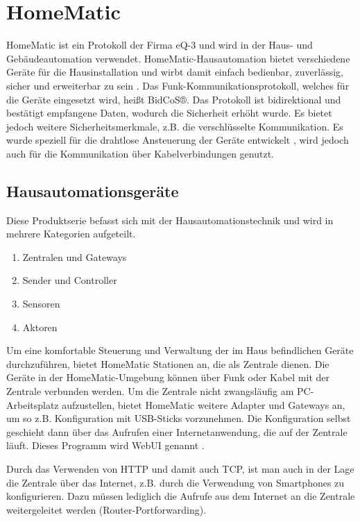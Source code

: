 \section{HomeMatic}

HomeMatic ist ein Protokoll der Firma eQ-3 und wird in der Haus- und Gebäudeautomation
verwendet.
HomeMatic-Hausautomation bietet verschiedene Geräte für die Hausinstallation und wirbt damit einfach bedienbar,
zuverlässig, sicher und erweiterbar zu sein \cite{homematic_eq3}.
Das Funk-Kommunikationsprotokoll, welches für die Geräte eingesetzt wird, heißt BidCoS®.
Das Protokoll ist bidirektional und bestätigt empfangene Daten, wodurch die Sicherheit
erhöht wurde.
Es bietet jedoch weitere Sicherheitsmerkmale, z.B. die verschlüsselte Kommunikation.
Es wurde speziell für die drahtlose Ansteuerung der Geräte entwickelt \cite{homematic_eq3_faq},
wird jedoch auch für die Kommunikation über Kabelverbindungen genutzt.

\subsection{Hausautomationsgeräte}

Diese Produktserie befasst sich mit der Hausautomationstechnik und wird in mehrere
Kategorien aufgeteilt.
\begin{enumerate}
\item{Zentralen und Gateways}
\item{Sender und Controller}
\item{Sensoren}
\item{Aktoren}
\end{enumerate}

Um eine komfortable Steuerung und Verwaltung der im Haus befindlichen Geräte durchzuführen,
bietet HomeMatic Stationen an, die als Zentrale dienen.
Die Geräte in der HomeMatic-Umgebung können über Funk oder Kabel mit der Zentrale verbunden
werden.
Um die Zentrale nicht zwangsläufig am PC-Arbeitsplatz aufzustellen, bietet HomeMatic weitere
Adapter und Gateways an, um so z.B. Konfiguration mit USB-Sticks vorzunehmen.
Die Konfiguration selbst geschieht dann über das Aufrufen einer Internetanwendung, die
auf der Zentrale läuft.
Dieses Programm wird WebUI genannt \cite{homematic_webui_manual}.

Durch das Verwenden von HTTP und damit auch TCP, ist man auch in der Lage die Zentrale
über das Internet, z.B. durch die Verwendung von Smartphones zu konfigurieren.
Dazu müssen lediglich die Aufrufe aus dem Internet an die Zentrale weitergeleitet werden
(Router-Portforwarding).

